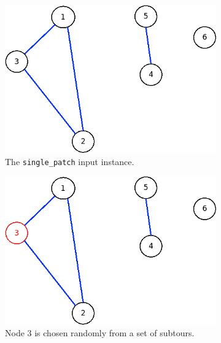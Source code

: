 \begin{figure}[!h]
	\begin{subfigure}{.26\columnwidth}
		\includegraphics[width=\columnwidth]{img/patching1.png}
		\caption{The \texttt{single\_patch} input instance.}
		\label{fig:patching1}
	\end{subfigure}
\hfill%
	\begin{subfigure}{.26\columnwidth}
		\includegraphics[width=\columnwidth]{img/patching2.png}
		\caption{Node $ 3 $ is chosen randomly from a set of subtours.}
		\label{fig:patching2}
	\end{subfigure}
\hfill%
	\begin{subfigure}{.26\columnwidth}

\end{subfigure}
\end{figure}
